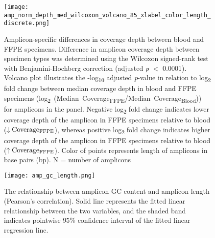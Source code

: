 \begin{figure}[H]
	\centering
	\texttt{[image: amp\_norm\_depth\_med\_wilcoxon\_volcano\_85\_xlabel\_color\_length\_discrete.png]}
	\caption[Amplicon-specific differences in coverage depth between blood and FFPE specimens.]{Amplicon-specific differences in coverage depth between blood and FFPE specimens. Difference in amplicon coverage depth between specimen types was determined using the Wilcoxon signed-rank test with Benjamini-Hochberg correction (adjusted \textit{p} $<$ 0.0001). Volcano plot illustrates the -log\textsubscript{10} adjusted \textit{p}-value in relation to log\textsubscript{2} fold change between median coverage depth in blood and FFPE specimens (\mbox{log\textsubscript{2} (Median Coverage\textsubscript{FFPE}/Median Coverage\textsubscript{Blood})}) for amplicons in the panel. Negative log\textsubscript{2} fold change indicates lower coverage depth of the amplicon in FFPE specimens relative to blood ($\downarrow \text{Coverage\textsubscript{FFPE}}$), whereas positive log\textsubscript{2} fold change indicates higher coverage depth of the amplicon in FFPE specimens relative to blood ($\uparrow\text{Coverage\textsubscript{FFPE}}$). Color of points represents length of amplicons in base pairs (bp). N = number of amplicons}
	\label{fig:amp_norm_depth_med_wilcoxon_volcano}
\end{figure}


\begin{figure}[H]
	\centering
	\texttt{[image: amp\_gc\_length.png]}
	\caption[The relationship between amplicon GC content and amplicon length (Pearson's correlation).]{The relationship between amplicon GC content and amplicon length (Pearson's correlation). Solid line represents the fitted linear relationship between the two variables, and the shaded band indicates pointwise 95\% confidence interval of the fitted linear regression line.}
	\label{fig:amp_gc_length}
\end{figure}


